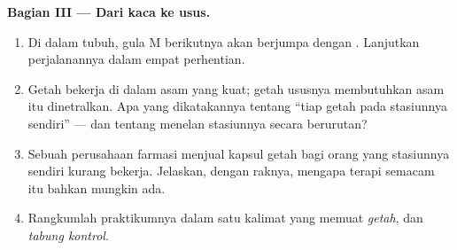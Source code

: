 \begin{problem}
\medskip\noindent\textbf{Bagian III --- Dari kaca ke usus.}
\begin{enumerate}[resume]
  \item Di dalam tubuh, gula M berikutnya akan berjumpa dengan . Lanjutkan perjalanannya dalam empat perhentian.
  \item Getah  bekerja di dalam asam yang kuat; getah
        ususnya membutuhkan asam itu dinetralkan. Apa yang dikatakannya
        tentang ``tiap getah pada  stasiunnya sendiri'' --- dan
        tentang menelan stasiunnya secara berurutan?
  \item Sebuah perusahaan farmasi menjual kapsul getah bagi orang yang
        stasiunnya sendiri kurang bekerja. Jelaskan, dengan raknya,
        mengapa terapi semacam itu bahkan mungkin ada.
  \item Rangkumlah praktikumnya dalam satu kalimat yang memuat
        \emph{getah}, \emph{} dan \emph{tabung kontrol}.
\end{enumerate}
\end{problem}
